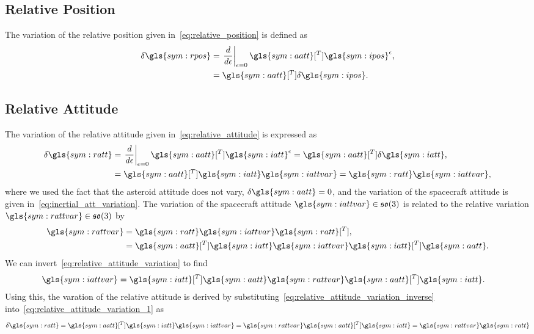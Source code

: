 \subsection{Relative Position}\label{sec:relative_position_variation}
The variation of the relative position given in~\cref{eq:relative_position} is defined as
\begin{align*}
    \delta \gls{sym:rpos} &= \left. \diff{}{\epsilon} \right|_{\epsilon=0} \gls{sym:aatt}[^T] \gls{sym:ipos}^\epsilon ,\nonumber \\
                        &= \gls{sym:aatt}[^T] \delta \gls{sym:ipos}.
\end{align*}

\subsection{Relative Attitude}\label{sec:relative_attitude_variation}
The variation of the relative attitude given in~\cref{eq:relative_attitude} is expressed as
\begin{align}
    \delta \gls{sym:ratt} &= \left. \diff{}{\epsilon} \right|_{\epsilon=0}  \gls{sym:aatt}[^T] \gls{sym:iatt}^\epsilon = \gls{sym:aatt}[^T] \delta \gls{sym:iatt}, \nonumber\\
                          &= \gls{sym:aatt}[^T] \gls{sym:iatt} \gls{sym:iattvar} = \gls{sym:ratt} \gls{sym:iattvar}, \label{eq:relative_attitude_variation_1}
\end{align}
where we used the fact that the asteroid attitude does not vary, \( \delta \gls{sym:aatt} = 0\), and the variation of the spacecraft attitude is given in~\cref{eq:inertial_att_variation}.
The variation of the spacecraft attitude \( \gls{sym:iattvar} \in \so \) is related to the relative variation \( \gls{sym:rattvar} \in \so \) by
\begin{align}
    \gls{sym:rattvar} &= \gls{sym:ratt} \gls{sym:iattvar} \gls{sym:ratt}[^T],\nonumber\\
                      &= \gls{sym:aatt}[^T] \gls{sym:iatt} \gls{sym:iattvar} \gls{sym:iatt}[^T] \gls{sym:aatt}.
\end{align}
We can invert~\cref{eq:relative_attitude_variation} to find
\begin{align}\label{eq:relative_attitude_variation_inverse}
    \gls{sym:iattvar} &= \gls{sym:iatt}[^T] \gls{sym:aatt} \gls{sym:rattvar} \gls{sym:aatt}[^T] \gls{sym:iatt}.
\end{align}
Using this, the varation of the relative attitude is derived by substituting~\cref{eq:relative_attitude_variation_inverse} into~\cref{eq:relative_attitude_variation_1} as
\begin{align}\label{eq:relative_attitude_matrix_variation}
    \delta \gls{sym:ratt} = \gls{sym:aatt}[^T] \gls{sym:iatt} \gls{sym:iattvar} = \gls{sym:rattvar} \gls{sym:aatt}[^T] \gls{sym:iatt} = \gls{sym:rattvar} \gls{sym:ratt}
\end{align}

